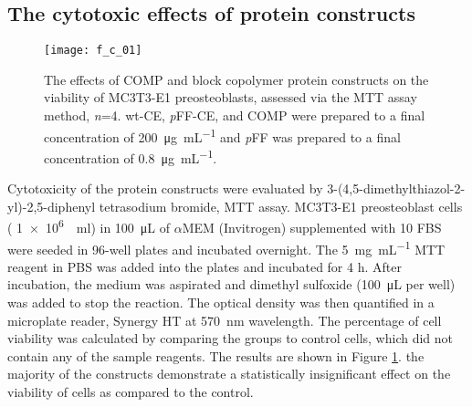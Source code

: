 \begin{refsection}
\section{The cytotoxic effects of protein constructs}
\begin{figure}[h!] \centering \texttt{[image: f\_c\_01]}
    \caption{The effects of COMP and block copolymer protein constructs on the
        viability of MC3T3-E1 preosteoblasts, assessed via the MTT assay method,
        \emph{n}=4. wt-CE, \emph{p}FF-CE, and COMP were prepared to a final
        concentration of \SI{200}{\ug\per\mL} and \emph{p}FF was prepared to a
        final concentration of \SI{0.8}{\ug\per\mL}.}\label{fig:mtt_results}
    \end{figure}
Cytotoxicity of the protein constructs were evaluated by
3-(4,5-dimethylthiazol-2-yl)-2,5-diphenyl tetrasodium bromide, MTT assay.
MC3T3-E1 preosteoblast cells (
\SI[scientific-notation=true,retain-unity-mantissa=true]{1e6}{\per\ml}) in
\SI{100}{\uL} of ${\alpha}$MEM (Invitrogen) supplemented with \SI{10}{\volper}
FBS were seeded in 96-well plates and incubated overnight. The
\SI{5}{\mg\per\mL} MTT reagent in PBS was added into the plates and incubated
for 4 h. After incubation, the medium was aspirated and dimethyl sulfoxide
(\SI{100}{\uL} per well) was added to stop the reaction. The optical density was
then quantified in a microplate reader, Synergy HT at \SI{570}{\nm} wavelength.
The percentage of cell viability was calculated by comparing the groups to
control cells, which did not contain any of the sample reagents. The results are
shown in Figure \ref{fig:mtt_results}. the majority of the constructs
demonstrate a statistically insignificant effect on the viability of cells as
compared to the control.


\end{refsection}
